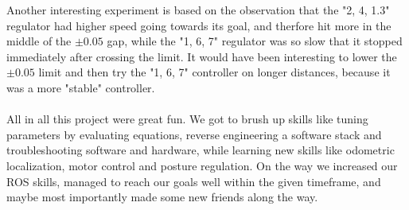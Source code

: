 \documentclass[a4paper,10pt]{article}
\begin{document}
		Another interesting experiment is based on the observation that the "2, 4, 1.3" regulator had higher speed going towards its goal, and therfore hit more in the middle of the $\pm0.05$ gap,
		while the "1, 6, 7" regulator was so slow that it stopped immediately after crossing the limit. It would have been interesting to lower the $\pm0.05$ limit and then try the "1, 6, 7" controller on
		longer distances, because it was a more "stable" controller.\\\\


		All in all this project were great fun. We got to brush up skills like tuning parameters by evaluating equations, reverse engineering a software stack and troubleshooting software and hardware, while learning new skills like odometric localization, motor control and posture regulation. On the way we increased our ROS skills, managed to reach our goals well within the given timeframe, and maybe most importantly made some new friends along the way. 
\end{document}
